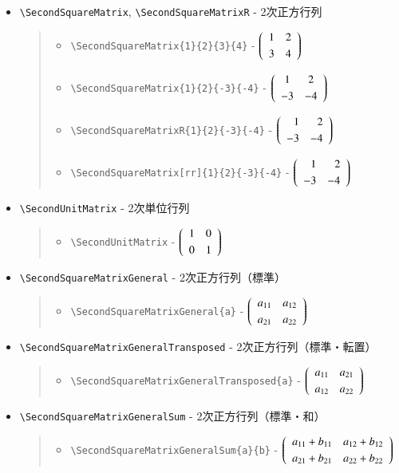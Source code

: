 \documentclass[oneside,10pt,a4paper]{jsarticle}
\begin{document}
  \begin{itemize}
    \item \verb|\SecondSquareMatrix|, \verb|\SecondSquareMatrixR| - 2次正方行列
      \begin{quote}
        \Example
        \begin{itemize}
          \item \verb|\SecondSquareMatrix{1}{2}{3}{4}| - $\SecondSquareMatrix{1}{2}{3}{4}$
          \item \verb|\SecondSquareMatrix{1}{2}{-3}{-4}| - $\SecondSquareMatrix{1}{2}{-3}{-4}$
          \item \verb|\SecondSquareMatrixR{1}{2}{-3}{-4}| - $\SecondSquareMatrixR{1}{2}{-3}{-4}$
          \item \verb|\SecondSquareMatrix[rr]{1}{2}{-3}{-4}| - $\SecondSquareMatrix[rr]{1}{2}{-3}{-4}$
        \end{itemize}
      \end{quote}
    \item \verb|\SecondUnitMatrix| - 2次単位行列
      \begin{quote}
        \Example
        \begin{itemize}
          \item \verb|\SecondUnitMatrix| - $\SecondUnitMatrix$
        \end{itemize}
      \end{quote}
    \item \verb|\SecondSquareMatrixGeneral| - 2次正方行列（標準）
      \begin{quote}
        \Example
        \begin{itemize}
          \item \verb|\SecondSquareMatrixGeneral{a}| - $\SecondSquareMatrixGeneral{a}$
        \end{itemize}
      \end{quote}
    \item \verb|\SecondSquareMatrixGeneralTransposed| - 2次正方行列（標準・転置）
      \begin{quote}
        \Example
        \begin{itemize}
          \item \verb|\SecondSquareMatrixGeneralTransposed{a}| - $\SecondSquareMatrixGeneralTransposed{a}$
        \end{itemize}
      \end{quote}
    \item \verb|\SecondSquareMatrixGeneralSum| - 2次正方行列（標準・和）
      \begin{quote}
        \Example
        \begin{itemize}
          \item \verb|\SecondSquareMatrixGeneralSum{a}{b}| - $\SecondSquareMatrixGeneralSum{a}{b}$
        \end{itemize}
      \end{quote}
  \end{itemize}
\end{document}
